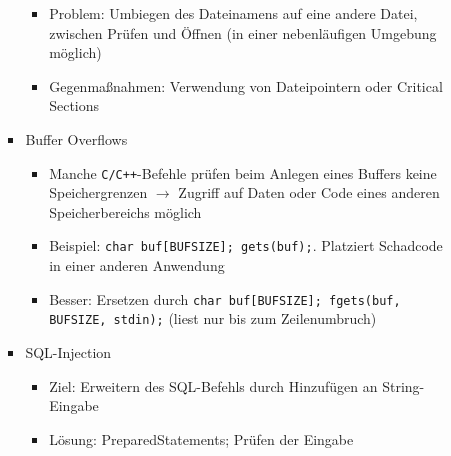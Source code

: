 \begin{itemize}
\begin{itemize}
\begin{itemize}
\begin{itemize}
				\item Problem: Umbiegen des Dateinamens auf eine andere Datei, zwischen Prüfen und Öffnen (in einer nebenläufigen Umgebung möglich)
				\item Gegenmaßnahmen: Verwendung von Dateipointern oder Critical Sections
			\end{itemize}
			\item Buffer Overflows
			\begin{itemize}
				\item Manche \texttt{C/C++}-Befehle prüfen beim Anlegen eines Buffers keine Speichergrenzen \(\rightarrow\) Zugriff auf Daten oder Code eines anderen Speicherbereichs möglich
				\item Beispiel: \texttt{char buf[BUFSIZE]; gets(buf);}. Platziert Schadcode in einer anderen Anwendung
				\item Besser: Ersetzen durch \texttt{char buf[BUFSIZE]; fgets(buf, BUFSIZE, stdin);} (liest nur bis zum Zeilenumbruch)
			\end{itemize}
			\item SQL-Injection
			\begin{itemize}
				\item Ziel: Erweitern des SQL-Befehls durch Hinzufügen an String-Eingabe
				\item Lösung: PreparedStatements; Prüfen der Eingabe
			\end{itemize}
		\end{itemize}
	\end{itemize}
\end{itemize}




